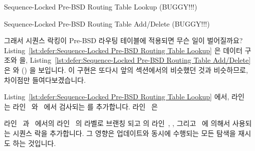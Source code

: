 \begin{listing}[tbp]

\caption{Sequence-Locked Pre-BSD Routing Table Lookup (BUGGY!!!)}
\label{lst:defer:Sequence-Locked Pre-BSD Routing Table Lookup}
\end{listing}

\begin{listing}[tbp]

\caption{Sequence-Locked Pre-BSD Routing Table Add\slash Delete (BUGGY!!!)}
\label{lst:defer:Sequence-Locked Pre-BSD Routing Table Add/Delete}
\end{listing}

그래서 시퀀스 락킹이 Pre-BSD 라우팅 테이블에 적용되면 무슨 일이 벌어질까요?
Listing~\ref{lst:defer:Sequence-Locked Pre-BSD Routing Table Lookup}
은 데이터 구조와  을,
Listing~\ref{lst:defer:Sequence-Locked Pre-BSD Routing Table Add/Delete}
은  와  () 을 보입니다.
이 구현은 또다시 앞의 섹션에서의 비슷했던 것과 비슷하므로, 차이점만
들여다보겠습니다.

\begin{fcvref}
Listing~\ref{lst:defer:Sequence-Locked Pre-BSD Routing Table Lookup} 에서,
라인~ 는 라인~
와~ 에서 검사되는  를 추가합니다.
라인~ 은
\end{fcvref}
\begin{fcvref}
라인~
과~ 에서의 라인~ 의  라벨로 브랜칭
되고  의 라인~, ,
그리고~ 에 의해서 사용되는 시퀀스 락을 추가합니다.
그 영향은 업데이트와 동시에 수행되는 모든 탐색을 재시도 하는 것입니다.
\end{fcvref}

